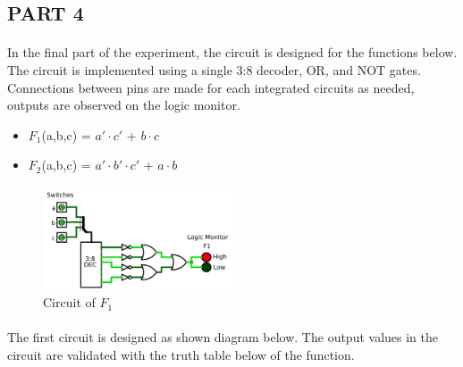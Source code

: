 \documentclass[pdftex,12pt,a4paper]{article}
\begin{document}
\begin{flushleft}


\subsection{PART 4}
\paragraph{}
In the final part of the experiment, the circuit is designed for the functions below. The circuit is implemented using a single 3:8 decoder, OR, and NOT gates. Connections between pins are made for each integrated circuits as needed, outputs are observed on the logic monitor.


\begin{itemize}
    \item $F_{1}$(a,b,c) = $a' \cdot c'$ + $b \cdot c$          
    \item $F_{2}$(a,b,c) = $a' \cdot b' \cdot c'$ + $a \cdot b$ 
\end{itemize}

\begin{figure}[!h]
	\centering
	\includegraphics[width=0.5\textwidth]{part4.png}	
	\caption{Circuit of $F_1$}
	\label{fig1}
\end{figure}


\paragraph{}
The first circuit is designed as shown diagram below. The output values in the circuit are validated with the truth table below of the function.


\end{flushleft}
\end{document}
